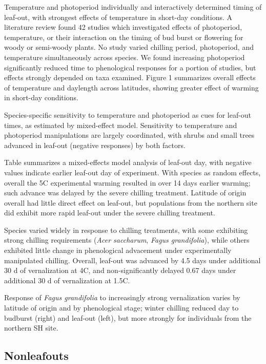 \documentclass[11pt]{article}
\begin{document}
Temperature and photoperiod individually and interactively determined timing of leaf-out, with strongest effects of temperature in short-day conditions. A literature review found 42 studies which investigated effects of photoperiod, temperature, or their interaction on the timing of bud burst or flowering for woody or semi-woody plants.  No study varied chilling period, photoperiod, and temperature simultaneously across species. We found increasing photoperiod significantly reduced time to phenological responses for a portion of studies, but effects strongly depended on taxa examined. Figure 1 summarizes overall effects of temperature and daylength across latitudes, showing greater effect of warming in short-day conditions.

Species-specific sensitivity to temperature and photoperiod as cues for leaf-out times, as estimated by mixed-effect model. Sensitivity to temperature and photoperiod manipulations are largely coordinated, with shrubs and small trees advanced in leaf-out (negative responses) by both factors.

Table  summarizes a mixed-effects model analysis of leaf-out day, with negative values indicate earlier leaf-out day of experiment. With species as random effects, overall the 5\degree C experimental warming resulted in over 14 days earlier warming; such advance was delayed by the severe chilling treatment. Latitude of origin overall had little direct effect on leaf-out, but populations from the northern site did exhibit more rapid leaf-out under the severe chilling treatment.

Species varied widely in response to chilling treatments, with some exhibiting strong chilling requirements (\emph{Acer saccharum}, \emph{Fagus grandifolia}), while others exhibited little change in phenological advacement under experimentally manipulated chilling. Overall, leaf-out was advanced by 4.5 days under additional 30 d of vernalization at 4\degree C, and non-significantly delayed 0.67 days under additional 30 d of vernalization at 1.5\degree C.

Response of \emph{Fagus grandifolia} to increasingly strong vernalization varies by latitude of origin and by phenological stage; winter chilling reduced day to budburst (right) and leaf-out (left), but more strongly for individuals from the northern SH site.


\subsection{Nonleafouts}
\end{document}

